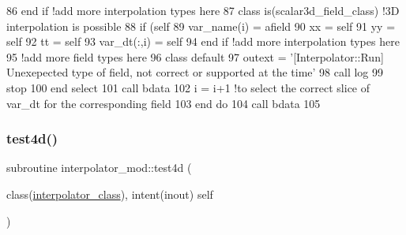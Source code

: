 \begin{DoxyCode}
86 \textcolor{keywordflow}{            end if} \textcolor{comment}{!add more interpolation types here}
87 \textcolor{keywordflow}{        class is}(scalar3d\_field\_class)          \textcolor{comment}{!3D interpolation is possible}
88             \textcolor{keywordflow}{if} (self%
89                 var\_name(i) = afield%
90                 xx = self%
91                 yy = self%
92                 tt = self%
93                 var\_dt(:,i) = self%
94 \textcolor{keywordflow}{            end if} \textcolor{comment}{!add more interpolation types here}
95             \textcolor{comment}{!add more field types here}
96 \textcolor{keywordflow}{            class default}
97             outext = \textcolor{stringliteral}{'[Interpolator::Run] Unexepected type of field, not correct or supported at the time'}
98             \textcolor{keyword}{call }log%
99             stop
100 \textcolor{keywordflow}{        end select}
101         \textcolor{keyword}{call }bdata%
102         i = i+1 \textcolor{comment}{!to select the correct slice of var\_dt for the corresponding field}
103 \textcolor{keywordflow}{    end do}
104     \textcolor{keyword}{call }bdata%
105 
\end{DoxyCode}
\mbox{\label{namespaceinterpolator__mod_ac27ad06522b34071302dc09d10b0ec7e}} 
\subsubsection{\texorpdfstring{test4d()}{test4d()}}
{\footnotesize\ttfamily subroutine interpolator\+\_\+mod\+::test4d (\begin{DoxyParamCaption}\item[{class(\mbox{\hyperlink{structinterpolator__mod_1_1interpolator__class}{interpolator\+\_\+class}}), intent(inout)}]{self }\end{DoxyParamCaption})\hspace{0.3cm}{\ttfamily [private]}}



